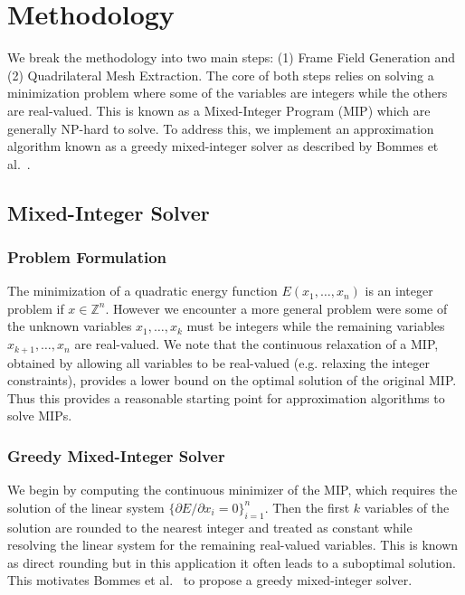 \documentclass[12pt, letterpaper]{article}
\begin{document}
\section{Methodology}
We break the methodology into two main steps: (1) Frame Field Generation and (2) Quadrilateral Mesh Extraction. The core of both steps relies on solving a minimization problem where some of the variables are integers while the others are real-valued. This is known as a Mixed-Integer Program (MIP) which are generally NP-hard to solve. To address this, we implement an approximation algorithm known as a greedy mixed-integer solver as described by Bommes et al.~\cite{bommes2009mixed}. 

\subsection{Mixed-Integer Solver}

\subsubsection{Problem Formulation}

The minimization of a quadratic energy function $E(x_1, \dots, x_n)$ is an integer problem if $x \in \mathbb{Z}^n$. However we encounter a more general problem were some of the unknown variables $x_1, \dots, x_k$ must be integers while the remaining variables $x_{k+1}, \dots, x_n$ are real-valued. We note that the continuous relaxation of a MIP, obtained by allowing all variables to be real-valued (e.g. relaxing the integer constraints), provides a lower bound on the optimal solution of the original MIP. Thus this provides a reasonable starting point for approximation algorithms to solve MIPs.

\subsubsection{Greedy Mixed-Integer Solver}
We begin by computing the continuous minimizer of the MIP, which requires the solution of the linear system $\{ \partial E / \partial x_i = 0 \}_{i=1}^n$. Then the first $k$ variables of the solution are rounded to the nearest integer and treated as constant while resolving the linear system for the remaining real-valued variables. This is known as direct rounding but in this application it often leads to a suboptimal solution. This motivates Bommes et al.~\cite{bommes2009mixed} to propose a greedy mixed-integer solver.
\end{document}

